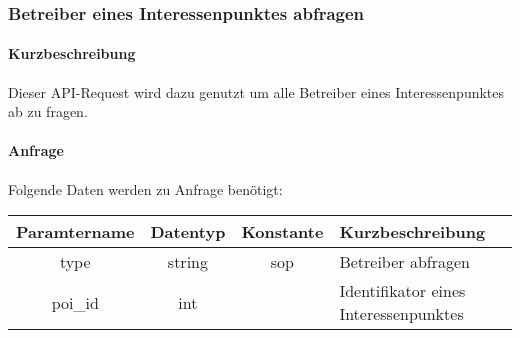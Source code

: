 \subsubsection{Betreiber eines Interessenpunktes abfragen}
\paragraph{Kurzbeschreibung}Dieser API-Request wird dazu genutzt um alle Betreiber eines Interessenpunktes ab zu fragen.
\paragraph{Anfrage}Folgende Daten werden zu Anfrage benötigt:
\begin{table}[H]
	\begin{tabular}{|c|c|c|p{6.5cm}|}
		\hline
		\textbf{Paramtername} & \textbf{Datentyp} & \textbf{Konstante} & \textbf{Kurzbeschreibung}                                                                                               \\ \hline
		type                & string            & sop                & Betreiber abfragen \\ \hline
		poi\_id             & int               &                    & Identifikator eines Interessenpunktes \\ \hline
	\end{tabular}
\end{table}
